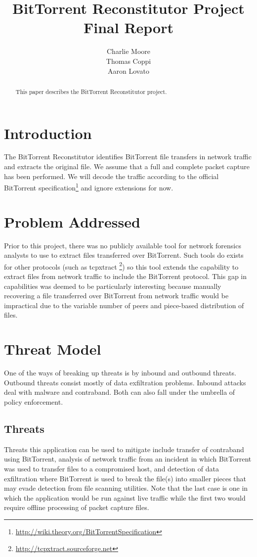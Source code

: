 \documentclass{acm_proc_article-sp}
\author{
  \alignauthor
  Charlie Moore\\
  \email{cmoore@nmt.edu}
  \alignauthor
  Thomas Coppi\\
  \email{tcoppi@nmt.edu}
  \alignauthor
  Aaron Lovato\\
  \email{alovato@nmt.edu}
}
\title{BitTorrent Reconstitutor Project Final Report}
\begin{document}
\maketitle
\begin{abstract}
This paper describes the BitTorrent Reconstitutor project.
\end{abstract}


\section{Introduction}
The BitTorrent Reconstitutor identifies BitTorrent file transfers in network
traffic and extracts the original file.  We assume that a full and complete
packet capture has been performed.  We will decode the traffic according to the
official BitTorrent
specification\footnote{\url{http://wiki.theory.org/BitTorrentSpecification}} and
ignore extensions for now.



\section{Problem Addressed}
Prior to this project, there was no publicly available tool for network
forensics analysts to use to extract files transferred over BitTorrent. Such
tools do exists for other protocols (such as tcpxtract
\footnote{\url{http://tcpxtract.sourceforge.net}}) so this tool extends the
capability to extract files from network traffic to include the BitTorrent
protocol. This gap in capabilities was deemed to be particularly interesting
because manually recovering a file transferred over BitTorrent from network
traffic would be impractical due to the variable number of peers and
piece-based distribution of files.


\section{Threat Model}
One of the ways of breaking up threats is by inbound and outbound threats.
Outbound threats consist mostly of data exfiltration problems.  Inbound attacks
deal with malware and contraband.  Both can also fall under the umbrella of
policy enforcement.

\subsection{Threats}
Threats this application can be used to mitigate include transfer of contraband
using BitTorrent, analysis of network traffic from an incident in which
BitTorrent was used to transfer files to a compromised host, and detection of
data exfiltration where BitTorrent is used to break the file(s) into smaller
pieces that may evade detection from file scanning utilities. Note that the
last case is one in which the application would be run against live traffic
while the first two would require offline processing of packet capture files.
\end{document}
